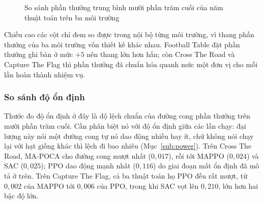 \begin{figure}[H]
    \centering
    \caption{So sánh phần thưởng trung bình mười phần trăm cuối của năm thuật toán trên
    ba môi trường}
    \label{fig:success_bar}
\end{figure}

\indent Chiều cao các cột chỉ đem so được trong nội bộ từng môi trường, vì thang phần
thưởng của ba môi trường vốn thiết kế khác nhau. Football Table đặt phần thưởng ghi bàn ở
mức $+5$ nên thang lớn hơn hẳn; còn Cross The Road và Capture The Flag thì phần thưởng
đã chuẩn hóa quanh mức một đơn vị cho mỗi lần hoàn thành nhiệm vụ.

\subsubsection{So sánh độ ổn định}
\label{sub:stability}
\indent Thước đo độ ổn định ở đây là độ lệch chuẩn của đường cong phần thưởng trên mười
phần trăm cuối. Cần phân biệt nó với độ ổn định giữa các lần chạy: đại lượng này nói một
đường cong tự nó dao động nhiều hay ít, chứ không nói chạy lại với hạt giống khác thì lệch
đi bao nhiêu (Mục~\ref{sub:power}). Trên Cross The Road, MA-POCA cho đường cong mượt nhất ($0{,}017$), rồi tới
MAPPO ($0{,}024$) và SAC ($0{,}025$); PPO dao động mạnh nhất ($0{,}116$) do giai đoạn mất
ổn định đã mô tả ở trên. Trên Capture The Flag, cả ba thuật toán họ PPO đều rất mượt, từ
$0{,}002$ của MAPPO tới $0{,}006$ của PPO, trong khi SAC vọt lên $0{,}210$, lớn hơn hai bậc độ lớn.


